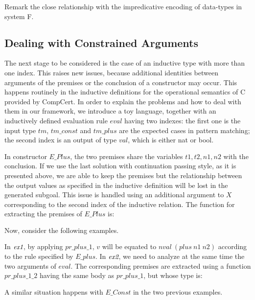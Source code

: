 \smallskip
{}
\smallskip

\noindent
Remark the close relationship with the impredicative encoding
of data-types in system F.


\subsection{Dealing with Constrained Arguments}
\label{sec:constrained-args}

The next stage to be considered is the case of
an inductive type with more than one index.
This raises new issues, because additional identities
between arguments of the premises or the conclusion
of a constructor may occur.
This happens routinely in the inductive definitions
for the operational semantics of C provided by CompCert.
In order to explain the problems and how to deal with
them in our framework, 
we introduce a toy language, together with
an inductively defined evaluation rule $eval$ having two indexes:
the first one is the input type $tm$, $tm\_const$ and $tm\_plus$ are the
expected cases in pattern matching;
the second index is an output of type $val$, which is either nat or bool.

\medskip
{}
\medskip

In constructor $E\_Plus$,
the two premises share the variables $t1, t2, n1, n2$ with the
conclusion. 
If we use the last solution 
with continuation passing style, as it is presented above,
we are able to keep the premises 
but the relationship between the output values
as specified in the inductive definition will be lost
in the generated subgoal.
%
This issue is handled using an additional argument to $X$ 
corresponding to the second index of the inductive relation.
The function for extracting the premises of $E\_Plus$ is:

\medskip
{}
\medskip

\noindent
Now, consider the following examples.

\smallskip
{}
\medskip
%
\noindent
In $\textit{ex1}$, by applying $pr\_plus\_1$, 
$v$ will be equated to $nval~(plus~n1~n2)$ 
according to the rule specified by $E\_plus$.
%
In $\textit{ex2}$,
we need to analyze at the same time the two arguments of $eval$.
The corresponding premises are extracted using a function $pr\_plus\_1\_2$
having the same body as $pr\_plus\_1$, but whose type is:

\medskip
{}
\medskip
%
\noindent
A similar situation happens with $E\_Const$ in the 
two previous examples.

